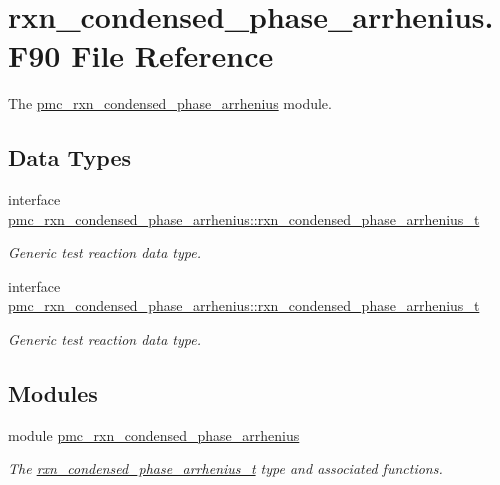\hypertarget{rxn__condensed__phase__arrhenius_8_f90}{}\section{rxn\+\_\+condensed\+\_\+phase\+\_\+arrhenius.\+F90 File Reference}
\label{rxn__condensed__phase__arrhenius_8_f90}


The \mbox{\hyperlink{namespacepmc__rxn__condensed__phase__arrhenius}{pmc\+\_\+rxn\+\_\+condensed\+\_\+phase\+\_\+arrhenius}} module.  


\subsection*{Data Types}
\begin{DoxyCompactItemize}
\item 
interface \mbox{\hyperlink{structpmc__rxn__condensed__phase__arrhenius_1_1rxn__condensed__phase__arrhenius__t}{pmc\+\_\+rxn\+\_\+condensed\+\_\+phase\+\_\+arrhenius\+::rxn\+\_\+condensed\+\_\+phase\+\_\+arrhenius\+\_\+t}}
\begin{DoxyCompactList}\small\item\em Generic test reaction data type. \end{DoxyCompactList}\item 
interface \mbox{\hyperlink{structpmc__rxn__condensed__phase__arrhenius_1_1rxn__condensed__phase__arrhenius__t}{pmc\+\_\+rxn\+\_\+condensed\+\_\+phase\+\_\+arrhenius\+::rxn\+\_\+condensed\+\_\+phase\+\_\+arrhenius\+\_\+t}}
\begin{DoxyCompactList}\small\item\em Generic test reaction data type. \end{DoxyCompactList}\end{DoxyCompactItemize}
\subsection*{Modules}
\begin{DoxyCompactItemize}
\item 
module \mbox{\hyperlink{namespacepmc__rxn__condensed__phase__arrhenius}{pmc\+\_\+rxn\+\_\+condensed\+\_\+phase\+\_\+arrhenius}}
\begin{DoxyCompactList}\small\item\em The \mbox{\hyperlink{structpmc__rxn__condensed__phase__arrhenius_1_1rxn__condensed__phase__arrhenius__t}{rxn\+\_\+condensed\+\_\+phase\+\_\+arrhenius\+\_\+t}} type and associated functions. \end{DoxyCompactList}\end{DoxyCompactItemize}
